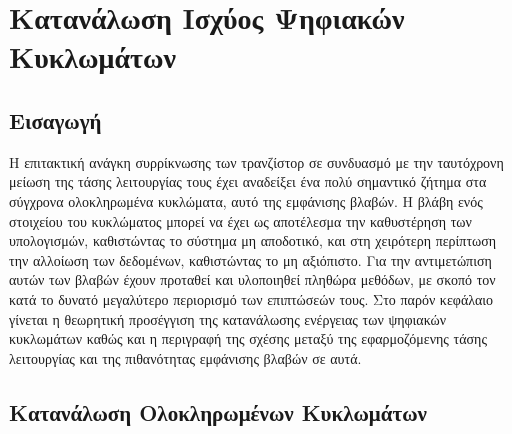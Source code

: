 \chapter{Κατανάλωση Ισχύος Ψηφιακών Κυκλωμάτων}
\label{chap3}

\section{Εισαγωγή}
\label{chap3_Intro}

Η επιτακτική ανάγκη συρρίκνωσης των τρανζίστορ σε συνδυασμό με την ταυτόχρονη μείωση της τάσης λειτουργίας τους έχει αναδείξει ένα πολύ σημαντικό ζήτημα στα σύγχρονα ολοκληρωμένα κυκλώματα, αυτό της εμφάνισης βλαβών. Η βλάβη ενός στοιχείου του κυκλώματος μπορεί να έχει ως αποτέλεσμα την καθυστέρηση των υπολογισμών, καθιστώντας το σύστημα μη αποδοτικό, και στη χειρότερη περίπτωση την αλλοίωση των δεδομένων, καθιστώντας το μη αξιόπιστο. Για την αντιμετώπιση αυτών των βλαβών έχουν προταθεί και υλοποιηθεί πληθώρα μεθόδων, με σκοπό τον κατά το δυνατό μεγαλύτερο περιορισμό των επιπτώσεών τους. Στο παρόν κεφάλαιο γίνεται η θεωρητική προσέγγιση της κατανάλωσης ενέργειας των ψηφιακών κυκλωμάτων καθώς και η περιγραφή της σχέσης μεταξύ της εφαρμοζόμενης τάσης λειτουργίας και της πιθανότητας εμφάνισης βλαβών σε αυτά.


\section{Κατανάλωση Ολοκληρωμένων Κυκλωμάτων}
\label{chap3_LowPowerSOC}

